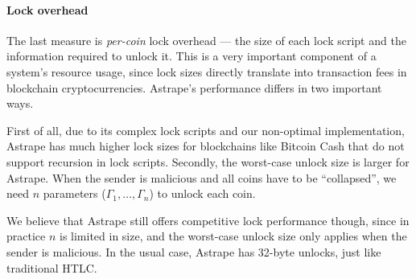 \documentclass[USenglish,oneside,twocolumn]{article}
\begin{document}
\paragraph*{Lock overhead}

The last measure is \emph{per-coin} lock overhead --- the size of each lock script and the information required to unlock it. This is a very important component of a system's resource usage, since lock sizes directly translate into transaction fees in blockchain cryptocurrencies. Astrape's performance differs in two important ways.

First of all, due to its complex lock scripts and our non-optimal implementation, Astrape has much higher lock sizes for blockchains like Bitcoin Cash that do not support recursion in lock scripts. Secondly, the worst-case unlock size is larger for Astrape. When the sender is malicious and all coins have to be ``collapsed'', we need $n$ parameters ($\Gamma_1, \dots, \Gamma_n$) to unlock each coin.

We believe that Astrape still offers competitive lock performance though, since in practice $n$ is limited in size, and the worst-case unlock size only applies when the sender is malicious. In the usual case, Astrape has 32-byte unlocks, just like traditional HTLC.




\end{document}
